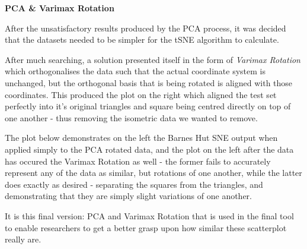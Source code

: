 \documentclass[a4paper,11pt,titlepage]{article}
\begin{document}
	\textbf{PCA \& Varimax Rotation}
	\par
	After the unsatisfactory results produced by the PCA process, it was decided that the datasets needed to be simpler for the tSNE algorithm to calculate. 
	\par 
	After much searching, a solution presented itself in the form of \textit{Varimax Rotation} \cite{Lin2012} which orthogonalises the data such that the actual coordinate system is unchanged, but the orthogonal basis that is being rotated is aligned with those coordinates. This produced the plot on the right which aligned the test set perfectly into it's original triangles and square being centred directly on top of one another - thus removing the isometric data we wanted to remove.
	\par 
	The plot below demonstrates on the left the Barnes Hut SNE output when applied simply to the PCA rotated data, and the plot on the left after the data has occured the Varimax Rotation as well - the former fails to accurately represent any of the data as similar, but rotations of one another, while the latter does exactly as desired - separating the squares from the triangles, and demonstrating that they are simply slight variations of one another.

	\begin{figure}[H]
    			\centering	
    			 \qquad
    			\caption{}%
    			\label{fig:pca_varimax}
	\end{figure}


	It is this final version: PCA and Varimax Rotation that is used in the final tool to enable researchers to get a better grasp upon how similar these scatterplot really are.
	
\end{document}
